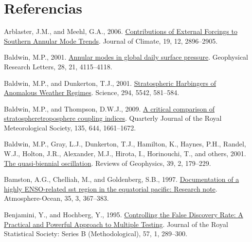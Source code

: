 \documentclass[12pt,oneside]{reedthesis}
\newlength{\cslhangindent}
\newenvironment{CSLReferences}[2] %
 {%
  \setlength{\parindent}{0pt}
  \ifodd #1 \everypar{\setlength{\hangindent}{\cslhangindent}}\ignorespaces\fi
  \ifnum #2 > 0
  \setlength{\parskip}{#2\baselineskip}
  \fi
 }%
 {}
\begin{document}
\backmatter

\hypertarget{referencias}{%
\section*{Referencias}\label{referencias}}


\noindent

\setlength{\parindent}{-0.20in}

\hypertarget{refs}{}
\begin{CSLReferences}{1}{0}
\leavevmode{}%
Arblaster, J.M., and Meehl, G.A., 2006. \href{https://doi.org/10.1175/JCLI3774.1}{Contributions of {External Forcings} to {Southern Annular Mode Trends}}. Journal of Climate, 19, 12, 2896--2905.

\leavevmode{}%
Baldwin, M.P., 2001. \href{https://doi.org/10.1029/2001GL013564}{Annular modes in global daily surface pressure}. Geophysical Research Letters, 28, 21, 4115--4118.

\leavevmode{}%
Baldwin, M.P., and Dunkerton, T.J., 2001. \href{https://doi.org/10.1126/science.1063315}{Stratospheric {Harbingers} of {Anomalous Weather Regimes}}. Science, 294, 5542, 581--584.

\leavevmode{}%
Baldwin, M.P., and Thompson, D.W.J., 2009. \href{https://doi.org/10.1002/qj.479}{A critical comparison of stratosphere\textendash troposphere coupling indices}. Quarterly Journal of the Royal Meteorological Society, 135, 644, 1661--1672.

\leavevmode{}%
Baldwin, M.P., Gray, L.J., Dunkerton, T.J., Hamilton, K., Haynes, P.H., Randel, W.J., Holton, J.R., Alexander, M.J., Hirota, I., Horinouchi, T., and others, 2001. \href{https://doi.org/10.1029/1999RG000073}{The quasi-biennial oscillation}. Reviews of Geophysics, 39, 2, 179--229.

\leavevmode{}%
Bamston, A.G., Chelliah, M., and Goldenberg, S.B., 1997. \href{https://doi.org/10.1080/07055900.1997.9649597}{Documentation of a highly {ENSO}-related sst region in the equatorial pacific: {Research} note}. Atmosphere-Ocean, 35, 3, 367--383.

\leavevmode{}%
Benjamini, Y., and Hochberg, Y., 1995. \href{https://doi.org/10.1111/j.2517-6161.1995.tb02031.x}{Controlling the {False Discovery Rate}: {A Practical} and {Powerful Approach} to {Multiple Testing}}. Journal of the Royal Statistical Society: Series B (Methodological), 57, 1, 289--300.


\end{CSLReferences}
\end{document}
